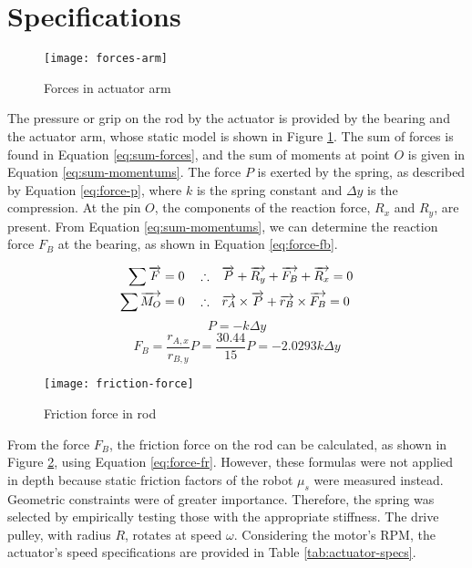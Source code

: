 \section{Specifications}

\begin{figure}[H]
    \centering
    \texttt{[image: forces-arm]}
    \caption{Forces in actuator arm}
    \label{fig:forces-arm}
\end{figure}

The pressure or grip on the rod by the actuator is provided by the bearing and the actuator arm, whose static model is shown in Figure \ref{fig:forces-arm}. The sum of forces is found in Equation \ref{eq:sum-forces}, and the sum of moments at point $O$ is given in Equation \ref{eq:sum-momentums}. The force $P$ is exerted by the spring, as described by Equation \ref{eq:force-p}, where $k$ is the spring constant and $\Delta y$ is the compression. At the pin $O$, the components of the reaction force, $R_x$ and $R_y$, are present. From Equation \ref{eq:sum-momentums}, we can determine the reaction force $F_B$ at the bearing, as shown in Equation \ref{eq:force-fb}.

\begin{align}
    \label{eq:sum-forces}
    \sum \overrightarrow{F}=0 \quad\therefore& \quad \overrightarrow{P} + \overrightarrow{R_y} + \overrightarrow{F_B}+\overrightarrow{R_x} = 0 \\
    \label{eq:sum-momentums}
    \sum \overrightarrow{M_O}=0 \quad\therefore& \quad \overrightarrow{r_A}\times\overrightarrow{P} + \overrightarrow{r_B}\times\overrightarrow{F_B} = 0
\end{align}
\begin{equation}
    \label{eq:force-p}
    P=-k\Delta y
\end{equation}
\begin{equation}
    \label{eq:force-fb}
    F_B = \frac{r_{A,x}}{r_{B,y}}P = \frac{30.44}{15}P=-2.0293k\Delta y
\end{equation}

\begin{figure}[H]
    \centering
    \texttt{[image: friction-force]}
    \caption{Friction force in rod}
    \label{fig:friction-force}
\end{figure}

From the force $F_B$, the friction force on the rod can be calculated, as shown in Figure \ref{fig:friction-force}, using Equation \ref{eq:force-fr}. However, these formulas were not applied in depth because static friction factors of the robot $\mu_s$ were measured instead. Geometric constraints were of greater importance. Therefore, the spring was selected by empirically testing those with the appropriate stiffness. The drive pulley, with radius $R$, rotates at speed $\omega$. Considering the motor's RPM, the actuator's speed specifications are provided in Table \ref{tab:actuator-specs}.

